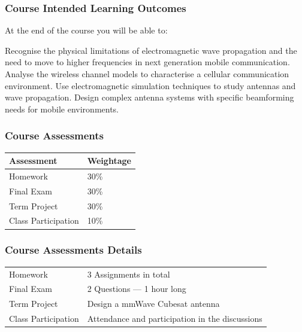 \documentclass[10pt, compress]{beamer}
\begin{document}
\begin{frame}[fragile]
  \frametitle{Course Intended Learning Outcomes}
      At the end of the course you will be able to:
      \begin{outline}[enumerate]
        \1 Recognise the physical limitations of electromagnetic wave propagation and the need to move to higher frequencies in next generation mobile communication.
        \1 Analyse the wireless channel models to characterise a cellular communication environment.
        \1 Use electromagnetic simulation techniques to study antennas and wave propagation.
        \1 Design complex antenna systems with specific beamforming needs for mobile environments.
        \end{outline}
\end{frame}
\begin{frame}[fragile]
  \frametitle{Course Assessments}
  \begin{table}
      \begin{tabular}{ll}
      \toprule
      Assessment & Weightage\\
      \midrule
      Homework & 30\% \\
      Final Exam & 30\% \\
      Term Project & 30\% \\
      Class Participation & 10\% \\
      \bottomrule
    \end{tabular}
  \end{table}
\end{frame}
\begin{frame}[fragile]
  \frametitle{Course Assessments Details}
  \begin{table}
      \begin{tabular}{ll}
      \midrule
      Homework & 3 Assignments in total \\
      Final Exam & 2 Questions — 1 hour long \\
      Term Project & Design a mmWave Cubesat antenna \\
      Class Participation & Attendance and participation in the discussions \\
      \bottomrule
    \end{tabular}
  \end{table}
\end{frame}
\end{document}
